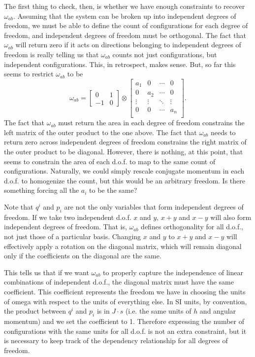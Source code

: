 The first thing to check, then, is whether we have enough constraints to recover $\omega_{ab}$. Assuming that the system can be broken up into independent degrees of freedom, we must be able to define the count of configurations for each degree of freedom, and independent degrees of freedom must be orthogonal. The fact that $\omega_{ab}$ will return zero if it acts on directions belonging to independent degrees of freedom is really telling us that $\omega_{ab}$ counts not just configurations, but independent configurations. This, in retrospect, makes sense. But, so far this seems to restrict $\omega_{ab}$ to be
\begin{equation}
	\omega_{ab} = \left[\begin{array}{cc}
		0 & 1 \\
		-1 & 0 
	\end{array} \right] \otimes   \left[ {\begin{array}{cccc}
		a_{1} & 0 & \cdots & 0\\
		0 & a_{2} & \cdots & 0\\
		\vdots & \vdots & \ddots & \vdots\\
		0 & 0 & \cdots & a_{n}\\
\end{array} } \right].
\end{equation}
The fact that $\omega_{ab}$ must return the area in each degree of freedom constrains the left matrix of the outer product to the one above. The fact that $\omega_{ab}$ needs to return zero across independent degrees of freedom constrains the right matrix of the outer product to be diagonal. However, there is nothing, at this point, that seems to constrain the area of each d.o.f. to map to the same count of configurations. Naturally, we could simply rescale conjugate momentum in each d.o.f. to homogenize the count, but this would be an arbitrary freedom. Is there something forcing all the $a_i$ to be the same?

Note that $q^i$ and $p_i$ are not the only variables that form independent degrees of freedom. If we take two independent d.o.f. $x$ and $y$, $x+y$ and $x-y$ will also form independent degrees of freedom. That is, $\omega_{ab}$ defines orthogonality for all d.o.f., not just those of a particular basis. Changing $x$ and $y$ to $x+y$ and $x-y$ will effectively apply a rotation on the diagonal matrix, which will remain diagonal only if the coefficients on the diagonal are the same.

This tells us that if we want $\omega_{ab}$ to properly capture the independence of linear combinations of independent d.o.f., the diagonal matrix must have the same coefficient. This coefficient represents the freedom we have in choosing the units of omega with respect to the units of everything else. In SI units, by convention, the product between $q^i$ and $p_i$ is in $J\cdot s$ (i.e. the same units of $h$ and angular momentum) and we set the coefficient to 1. Therefore expressing the number of configurations with the same units for all d.o.f. is not an extra constraint, but it is necessary to keep track of the dependency relationship for all degrees of freedom.

